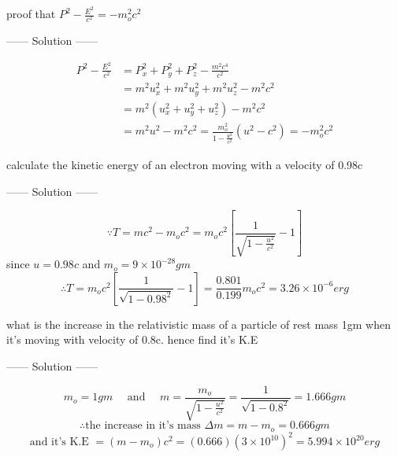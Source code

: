 \documentclass{article}
\begin{document}
\begin{example}
proof that $P^2 - \frac{E^2}{c^2} = -m_o^2 c^2$
\begin{center}
    ------ \textcolor{Solution}{Solution} ------
\end{center}
\begin{align*}
    P^2 - \frac{E^2}{c^2} &= P_x^2 + P_y^2 + P_z^2 - \frac{m^2 c^4}{c^2}\\
                          &= m^2 u_x^2 + m^2 u_y^2 + m^2 u_z^2 - m^2 c^2\\
                          &= m^2 \left(u_x^2 + u_y^2 + u_z^2\right) - m^2 c^2\\
                          &= m^2 u^2 - m^2 c^2 = \frac{m_o^2}{1 - \frac{u^2}{c^2}} (u^2 - c^2) = -m_o^2 c^2
\end{align*}
\end{example}
\begin{example}
calculate the kinetic energy of an electron moving with a velocity of 0.98c
\begin{center}
    ------ \textcolor{Solution}{Solution} ------
\end{center}
\[
\because T = mc^2 - m_o c^2 = m_o c^2 \left[\frac{1}{\sqrt{1- \frac{u^2}{c^2}}}-1\right]
\]
since $u= 0.98c$ and $m_o = 9\times 10^{-28}\si{gm}$
\[
\therefore T = m_o c^2 \left[\frac{1}{\sqrt{1- 0.98^2}}-1\right]  = \frac{0.801}{0.199}m_o c^2 = 3.26 \times 10^{-6} \si{erg}
\]
\end{example}
\begin{example}
what is the increase in the relativistic mass of a particle of rest mass 1gm when it's moving with velocity of 0.8c. hence find it's K.E
\begin{center}
    ------ \textcolor{Solution}{Solution} ------
\end{center}
\[
m_o = 1gm \ \ \ \ \ \ \text{and} \ \ \ \ \ \ m = \frac{m_o}{\sqrt{1 - \frac{u^2}{c^2}}} = \frac{1}{\sqrt{1 - 0.8^2}} = 1.666\si{gm}
\]
\[
\therefore \text{the increase in it's mass } \Delta m = m-m_o = 0.666\si{gm} 
\]
\[
\text{and it's K.E } = (m-m_o)c^2 = (0.666){(3 \times 10^{10})}^2 = 5.994\times 10^{20}\si{erg}
\]
\end{example}
\end{document}
